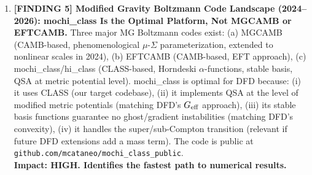 \documentclass[11pt]{article}
\theoremstyle{definition}
\theoremstyle{remark}
\newcommand{\Geff}{G_{\rm eff}}
\begin{document}
\begin{tcolorbox}[colback=blue!5!white, colframe=blue!60!black,
  title=\textbf{W4i19 TOP 5 FINDINGS --- RANKED BY IMPACT}]
\begin{enumerate}[nosep]
\item \textbf{[FINDING 5] Modified Gravity Boltzmann Code Landscape (2024--2026):
  mochi\_class Is the Optimal Platform, Not MGCAMB or EFTCAMB.}
  Three major MG Boltzmann codes exist: (a) MGCAMB (CAMB-based,
  phenomenological $\mu$-$\Sigma$ parameterization, extended to nonlinear
  scales in 2024), (b) EFTCAMB (CAMB-based, EFT approach), (c)
  mochi\_class/hi\_class (CLASS-based, Horndeski $\alpha$-functions,
  stable basis, QSA at metric potential level). mochi\_class is optimal
  for DFD because: (i) it uses CLASS (our target codebase), (ii) it
  implements QSA at the level of modified metric potentials (matching
  DFD's $\Geff$ approach), (iii) its stable basis functions guarantee
  no ghost/gradient instabilities (matching DFD's convexity), (iv) it
  handles the super/sub-Compton transition (relevant if future DFD
  extensions add a mass term). The code is public at
  \texttt{github.com/mcataneo/mochi\_class\_public}.\\
  \textbf{Impact: HIGH. Identifies the fastest path to numerical results.}

\end{enumerate}
\end{tcolorbox}
\end{document}

